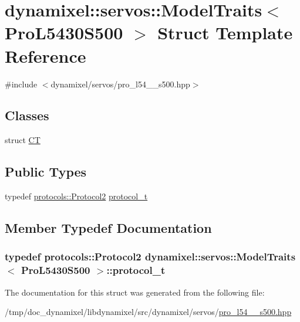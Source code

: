 \hypertarget{structdynamixel_1_1servos_1_1_model_traits_3_01_pro_l5430_s500_01_4}{}\section{dynamixel\+:\+:servos\+:\+:Model\+Traits$<$ Pro\+L5430\+S500 $>$ Struct Template Reference}
\label{structdynamixel_1_1servos_1_1_model_traits_3_01_pro_l5430_s500_01_4}


{\ttfamily \#include $<$dynamixel/servos/pro\+\_\+l54\+\_\+\_\+s500.\+hpp$>$}

\subsection*{Classes}
\begin{DoxyCompactItemize}
\item 
struct \hyperlink{structdynamixel_1_1servos_1_1_model_traits_3_01_pro_l5430_s500_01_4_1_1_c_t}{CT}
\end{DoxyCompactItemize}
\subsection*{Public Types}
\begin{DoxyCompactItemize}
\item 
typedef \hyperlink{classdynamixel_1_1protocols_1_1_protocol2}{protocols\+::\+Protocol2} \hyperlink{structdynamixel_1_1servos_1_1_model_traits_3_01_pro_l5430_s500_01_4_a3fe3592ead71f8eb670ca7ea30b84d56}{protocol\+\_\+t}
\end{DoxyCompactItemize}


\subsection{Member Typedef Documentation}
\subsubsection[{\texorpdfstring{protocol\+\_\+t}{protocol_t}}]{\setlength{\rightskip}{0pt plus 5cm}typedef {\bf protocols\+::\+Protocol2} {\bf dynamixel\+::servos\+::\+Model\+Traits}$<$ {\bf Pro\+L5430\+S500} $>$\+::{\bf protocol\+\_\+t}}\hypertarget{structdynamixel_1_1servos_1_1_model_traits_3_01_pro_l5430_s500_01_4_a3fe3592ead71f8eb670ca7ea30b84d56}{}\label{structdynamixel_1_1servos_1_1_model_traits_3_01_pro_l5430_s500_01_4_a3fe3592ead71f8eb670ca7ea30b84d56}


The documentation for this struct was generated from the following file\+:\begin{DoxyCompactItemize}
\item 
/tmp/doc\+\_\+dynamixel/libdynamixel/src/dynamixel/servos/\hyperlink{pro__l54__30__s500_8hpp}{pro\+\_\+l54\+\_\+\_\+s500.\+hpp}\end{DoxyCompactItemize}
